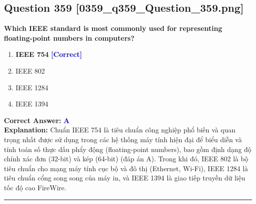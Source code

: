 \documentclass[11pt,a4paper]{article}
\begin{document}
\begin{minipage}{\textwidth}
\subsection*{Question 359 \quad \footnotesize{[0359\_q359\_Question\_359.png]}}
\noindent \textbf{Which IEEE standard is most commonly used for representing floating-point numbers in computers?}

\begin{enumerate}[label=\Alph*.]
    \item \textbf{IEEE 754} \hfill \textcolor{blue}{\textbf{[Correct]}}
    \item IEEE 802
    \item IEEE 1284
    \item IEEE 1394
\end{enumerate}

\noindent \textbf{Correct Answer:} \textcolor{blue}{\textbf{A}} \\[2pt]
\noindent \textbf{Explanation:} Chuẩn IEEE 754 là tiêu chuẩn công nghiệp phổ biến và quan trọng nhất được sử dụng trong các hệ thống máy tính hiện đại để biểu diễn và tính toán số thực dấu phẩy động (floating-point numbers), bao gồm định dạng độ chính xác đơn (32-bit) và kép (64-bit) (đáp án A). Trong khi đó, IEEE 802 là bộ tiêu chuẩn cho mạng máy tính cục bộ và đô thị (Ethernet, Wi-Fi), IEEE 1284 là tiêu chuẩn cổng song song của máy in, và IEEE 1394 là giao tiếp truyền dữ liệu tốc độ cao FireWire.

\par\vspace{0.3cm}
\hrule
\vspace{0.3cm}
\end{minipage}
\end{document}
